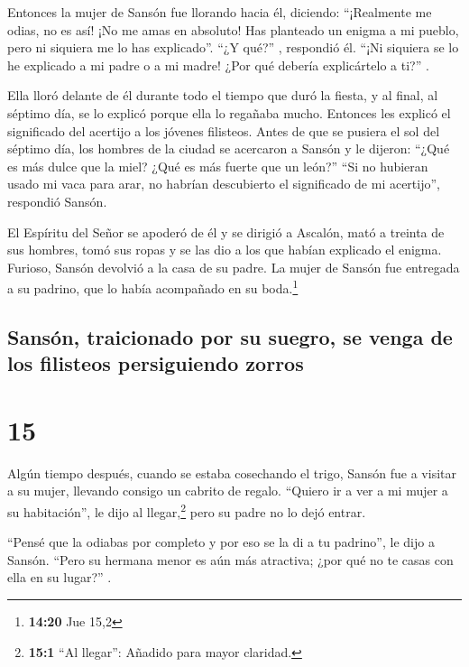  Entonces la mujer de Sansón fue llorando hacia él,
diciendo: ``¡Realmente me odias, no es así! ¡No me amas en absoluto! Has
planteado un enigma a mi pueblo, pero ni siquiera me lo has explicado''.
``¿Y qué?'' , respondió él. ``¡Ni siquiera se lo he explicado a mi padre
o a mi madre! ¿Por qué debería explicártelo a ti?'' .

 Ella lloró delante de él durante todo el tiempo que duró
la fiesta, y al final, al séptimo día, se lo explicó porque ella lo
regañaba mucho. Entonces les explicó el significado del acertijo a los
jóvenes filisteos.  Antes de que se pusiera el sol del
séptimo día, los hombres de la ciudad se acercaron a Sansón y le
dijeron: ``¿Qué es más dulce que la miel? ¿Qué es más fuerte que un
león?'' ``Si no hubieran usado mi vaca para arar, no habrían descubierto
el significado de mi acertijo'', respondió Sansón.

 El Espíritu del Señor se apoderó de él y se dirigió a
Ascalón, mató a treinta de sus hombres, tomó sus ropas y se las dio a
los que habían explicado el enigma. Furioso, Sansón devolvió a la casa
de su padre.  La mujer de Sansón fue entregada a su
padrino, que lo había acompañado en su boda.\footnote{\textbf{14:20} Jue
  15,2}

\hypertarget{sansuxf3n-traicionado-por-su-suegro-se-venga-de-los-filisteos-persiguiendo-zorros}{%
\subsection{Sansón, traicionado por su suegro, se venga de los filisteos
persiguiendo
zorros}\label{sansuxf3n-traicionado-por-su-suegro-se-venga-de-los-filisteos-persiguiendo-zorros}}

\hypertarget{section-14}{%
\section{15}\label{section-14}}

 Algún tiempo después, cuando se estaba cosechando el
trigo, Sansón fue a visitar a su mujer, llevando consigo un cabrito de
regalo. ``Quiero ir a ver a mi mujer a su habitación'', le dijo al
llegar,\footnote{\textbf{15:1} ``Al llegar'': Añadido para mayor
  claridad.} pero su padre no lo dejó entrar.

 ``Pensé que la odiabas por completo y por eso se la di a
tu padrino'', le dijo a Sansón. ``Pero su hermana menor es aún más
atractiva; ¿por qué no te casas con ella en su lugar?'' .

